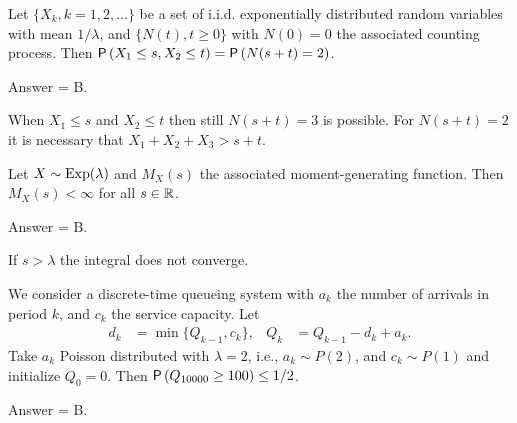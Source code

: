 \begin{exercise}[201903]
Let $\{X_k, k=1, 2, \ldots\}$ be a set of i.i.d. exponentially distributed random variables with mean $1/\lambda$, and $\{N(t), t\geq 0\}$ with $N(0)=0$ the associated counting process. Then $\P{X_1\leq s, X_2 \leq t} = \P{N(s+t) = 2}$. 
\begin{solution}
 Answer = B.

 When $X_1\leq s$ and $X_2\leq t$ then still $N(s+t)=3$ is possible. For $N(s+t)=2$ it is necessary that $X_1+X_2 + X_3 > s+t$. 
\end{solution}
\end{exercise}

\begin{exercise}[201903]
Let $X\sim\operatorname{Exp}(\lambda)$ and $M_X(s)$ the associated moment-generating function. Then $M_X(s)<\infty$ for all $s\in \mathbb{R}$. 
\begin{solution}
 Answer = B.

 If $s>\lambda$ the integral does not converge. 
\end{solution}
\end{exercise}

\begin{exercise}[201903]
We consider a discrete-time queueing system with $a_k$ the number of arrivals in period $k$, and $c_k$ the service capacity. Let
\begin{align}
d_k &= \min\{Q_{k-1}, c_k\}, & Q_k &= Q_{k-1} -d_k + a_k.
\end{align}
Take $a_k$ Poisson distributed with $\lambda=2$, i.e., $a_k \sim P(2)$, and $c_k\sim P(1)$ and initialize $Q_0 = 0$. Then $\P{Q_{10000} \geq 100} \leq 1/2$. 
\begin{solution}
Answer = B.
\end{solution}
\end{exercise}

